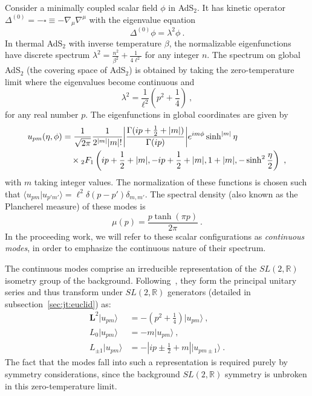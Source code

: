 \documentclass[12pt]{article}
\begin{document}
Consider a minimally coupled scalar field $\phi$ in AdS$_2$. It has kinetic operator $\Delta^{(0)} = -\square \equiv - \nabla_\mu \nabla^\mu$
with the eigenvalue equation
%
\begin{equation}
	\Delta^{(0)} \phi = \lambda^2 \phi~.
\label{eq:euclid_eig}
\end{equation}
%
In thermal AdS$_2$ with inverse temperature $\beta$, the normalizable eigenfunctions have discrete spectrum $\lambda^2 = \frac{n^2}{\beta^2} + \frac{1}{4\ell^2}$ for any integer $n$.  The spectrum on global AdS$_2$ (the covering space of AdS$_2$) is obtained by taking the zero-temperature limit where the eigenvalues become continuous and
%
\begin{equation}
	\lambda^2 = \frac{1}{\ell^2}\left(p^2 + \frac{1}{4}\right)~,
\end{equation}
%
for any real number $p$.  The eigenfunctions in global coordinates are given by~\cite{Camporesi:1994ga}
%
\begin{equation}\begin{aligned}
	u_{p m}(\eta, \phi) &= \frac{1}{\sqrt{2\pi}} \frac{1}{2^{|m|} |m|!} \bigg{|} \frac{\Gamma(ip + \frac{1}{2} + |m|)}{\Gamma(ip)}\bigg{|} e^{i m \phi} \sinh^{|m|}\eta \\
	&\quad \times{}_{2}F_1\left(ip + \frac{1}{2} + |m|, -i p + \frac{1}{2} + |m|, 1 + |m|, - \sinh^2\frac{\eta}{2}\right)~,
\label{eq:upm}
\end{aligned}\end{equation}
%
with $m$ taking integer values.  The normalization of these functions is chosen such that $\langle u_{p m} | u_{p' m'} \rangle = \ell^2 \delta(p - p') \delta_{m,m'}$.  The spectral density (also known as the Plancherel measure) of these modes is
\begin{equation}
	\mu(p) = \frac{p \tanh(\pi p)}{2\pi}~.
	\label{eqn:Planch}
\end{equation}
In the proceeding work, we will refer to these scalar configurations as \emph{continuous modes}, in order to emphasize the continuous nature of their spectrum.

The continuous modes comprise an irreducible representation of the $SL(2,\mathbb{R})$ isometry group of the background.  Following~\cite{Kitaev:2017hnr}, they form the principal unitary series and thus transform under $SL(2,\mathbb{R})$ generators (detailed in subsection~\ref{sec:jt:euclid}) as:
%
\begin{equation}\begin{aligned}
	\mathbf{L}^2 |u_{p m}\rangle &= -\left(p^2 + \frac{1}{4}\right)|u_{p m}\rangle~, \\
	L_0 |u_{p m}\rangle &= -m |u_{p m}\rangle~, \\
	L_{\pm 1} |u_{p m}\rangle &= - \left| ip \pm \frac{1}{2} + m \right| |u_{p m\pm 1}\rangle~.
\label{eq:rep}
\end{aligned}\end{equation}
%
The fact that the modes fall into such a representation is required purely by symmetry considerations, since the background $SL(2,\mathbb{R})$ symmetry is unbroken in this zero-temperature limit.
\end{document}
